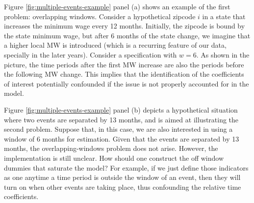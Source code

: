     Figure \ref{fig:multiple-events-example} panel (a) shows an example of the first problem: overlapping windows. Consider a hypothetical zipcode $i$ in a state that increases the minimum wage every 12 months. Initially, the zipcode is bound by the state minimum wage, but after 6 months of the state change, we imagine that a higher local MW is introduced (which is a recurring feature of our data, specially in the later years). Consider a specification with $w = 6$. As shown in the picture, the time periods after the first MW increase are also the periods before the following MW change. This implies that the identification of the coefficients of interest potentially confounded if the issue is not properly accounted for in the model.
    
    Figure \ref{fig:multiple-events-example} panel (b) depicts a hypothetical situation where two events are separated by 13 months, and is aimed at illustrating the second problem. Suppose that, in this case, we are also interested in using a window of 6 months for estimation. Given that the events are separated by 13 months, the overlapping-windows problem does not arise. However, the implementation is still unclear. How should one construct the off window dummies that saturate the model? For example, if we just define those indicators as one anytime a time period is outside the window of an event, then they will turn on when other events are taking place, thus confounding the relative time coefficients.
    
